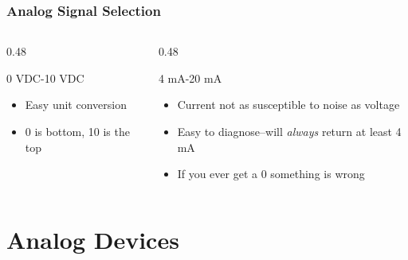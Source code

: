 \begin{frame}
    \frametitle{Analog Signal Selection}

    \begin{columns}[t]
        \begin{column}{0.48\linewidth}
            \begin{block}{0 VDC-10 VDC}
                \begin{itemize}
                    \item Easy unit conversion
                    \item 0 is bottom, 10 is the top
                \end{itemize}
            \end{block}
        \end{column}
        \begin{column}{0.48\linewidth}
            \begin{block}{4 mA-20 mA}
                \begin{itemize}
                    \item Current not as susceptible to noise as voltage
                    \item Easy to diagnose--will \emph{always} return at least 4 mA
                    \item If you ever get a 0 something is wrong
                \end{itemize}
            \end{block}
        \end{column}
    \end{columns}
\end{frame}

\section{Analog Devices}

